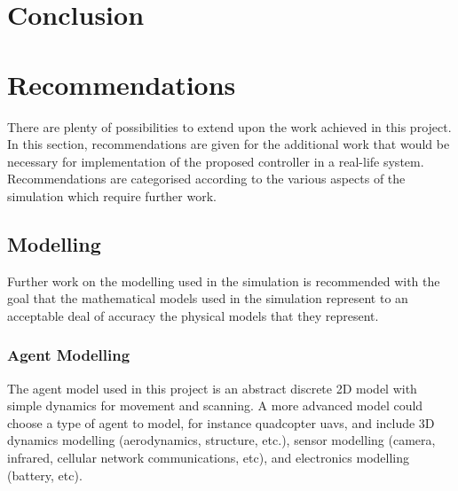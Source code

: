 \documentclass[conference]{IEEEtran}
\begin{document}
\section{Conclusion}\label{sec:conclusion}

\section{Recommendations}\label{sec:recommendations}


There are plenty of possibilities to extend upon the work achieved in this project.
In this section, recommendations are given for the additional work that would be necessary for implementation of the proposed controller in a real-life system.
Recommendations are categorised according to the various aspects of the simulation which require further work.

\subsection{Modelling}

Further work on the modelling used in the simulation is recommended with the goal that the mathematical models used in the simulation represent to an acceptable deal of accuracy the physical models that they represent.

\subsubsection{Agent Modelling}
The agent model used in this project is an abstract discrete 2D model with simple dynamics for movement and scanning.
A more advanced model could choose a type of agent to model, for instance quadcopter \gls{uav}s, and include 3D dynamics modelling (aerodynamics, structure, etc.), sensor modelling (camera, infrared, cellular network communications, etc), and electronics modelling (battery, etc).
\end{document}
